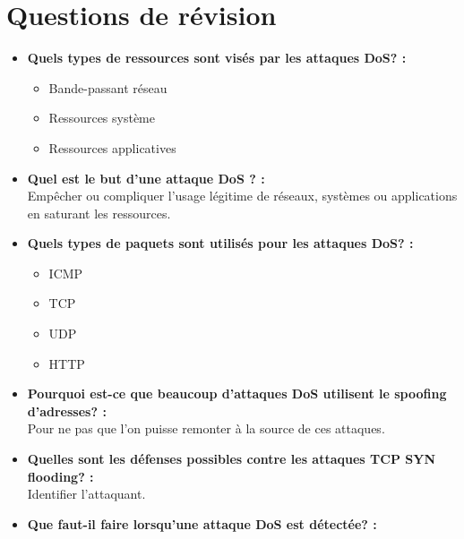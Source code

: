 \documentclass{report}
\begin{document}
		\section{Questions de révision}

			\begin{itemize}
				\item \textbf{Quels types de ressources sont visés par les attaques DoS? : }\\

					\begin{itemize}
						\item Bande-passant réseau
						\item Ressources système
						\item Ressources applicatives
					\end{itemize}

				\item \textbf{Quel est le but d'une attaque DoS ? :}\\

					Empêcher ou compliquer l'usage légitime de réseaux, systèmes ou applications en saturant les ressources.\\

				\item \textbf{Quels types de paquets sont utilisés pour les attaques DoS? :}\\

					\begin{itemize}
						\item ICMP
						\item TCP
						\item UDP
						\item HTTP	
					\end{itemize}

				\item \textbf{Pourquoi est-ce que beaucoup d'attaques DoS utilisent le spoofing d'adresses? : }\\

					Pour ne pas que l'on puisse remonter à la source de ces attaques.\\

				\item \textbf{Quelles sont les défenses possibles contre les attaques TCP SYN flooding? : }\\

					Identifier l'attaquant.\\

				\item \textbf{Que faut-il faire lorsqu'une attaque DoS est détectée? : }\\


\end{itemize}
\end{document}

